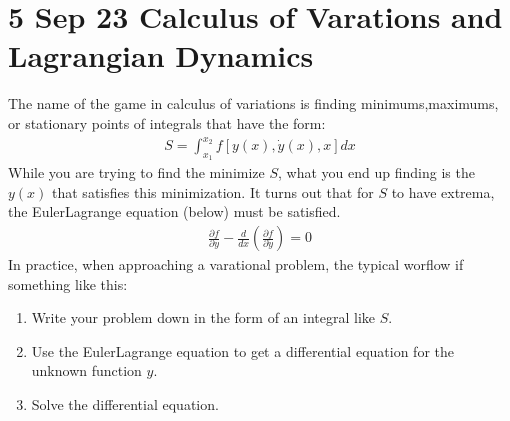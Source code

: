 \documentclass[letterpaper,10pt,english]{jupyterBook}
\begin{document}
\chapter{5 Sep 23 \sphinxhyphen{} Calculus of Varations and Lagrangian Dynamics}
\label{\detokenize{content/1_mechanics/lagrange_1:sep-23-calculus-of-varations-and-lagrangian-dynamics}}\label{\detokenize{content/1_mechanics/lagrange_1::doc}}
\sphinxAtStartPar
The name of the game in calculus of variations is finding minimums,maximums, or stationary points of integrals that have the form:
\begin{equation*}
\begin{split}
S = \int_{x_1}^{x_2} f[y(x),\dot{y}(x),x] dx
\end{split}
\end{equation*}
\sphinxAtStartPar
While you are trying to find the minimize \(S\), what you end up finding is the  \(y(x)\) that satisfies this minimization. It turns out that for \(S\) to have extrema, the Euler\sphinxhyphen{}Lagrange equation (below) must be satisfied.
\begin{equation*}
\begin{split}
\frac{\partial f}{\partial y} - \frac{d}{dx}\left(\frac{\partial f}{\partial \dot{y}} \right) = 0
\end{split}
\end{equation*}
\sphinxAtStartPar
In practice, when approaching a varational problem, the typical worflow if something like this:
\begin{enumerate}
%
\item {} 
\sphinxAtStartPar
Write your problem down in the form of an integral like \(S\).

\item {} 
\sphinxAtStartPar
Use the Euler\sphinxhyphen{}Lagrange equation to get a differential equation for the unknown function \(y\).

\item {} 
\sphinxAtStartPar
Solve the differential equation.

\end{enumerate}
\end{document}
